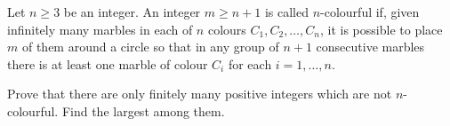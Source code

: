 Let $n \geq 3$ be an integer. An integer $m \geq n + 1$ is called $n$-colourful if, given infinitely many marbles in each of $n$ colours $C_1, C_2, \ldots, C_n$, it is possible to place $m$ of them around a circle so that in any group of $n + 1$ consecutive marbles there is at least one marble of colour $C_i$ for each $i = 1, \ldots, n$.

Prove that there are only finitely many positive integers which are not $n$-colourful. Find the largest among them.
